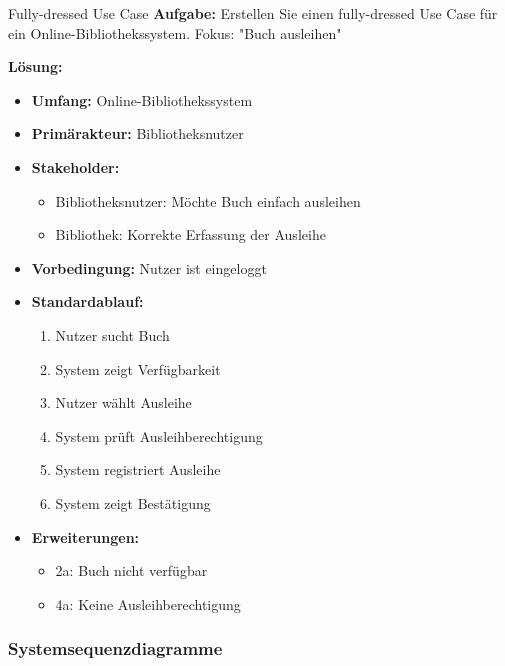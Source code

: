 \begin{example2}{Fully-dressed Use Case}
\textbf{Aufgabe:} Erstellen Sie einen fully-dressed Use Case für ein Online-Bibliothekssystem. Fokus: "Buch ausleihen"

\textbf{Lösung:}
\begin{itemize}
    \item \textbf{Umfang:} Online-Bibliothekssystem
    \item \textbf{Primärakteur:} Bibliotheksnutzer
    \item \textbf{Stakeholder:} 
    \begin{itemize}
        \item Bibliotheksnutzer: Möchte Buch einfach ausleihen
        \item Bibliothek: Korrekte Erfassung der Ausleihe
    \end{itemize}
    \item \textbf{Vorbedingung:} Nutzer ist eingeloggt
    \item \textbf{Standardablauf:}
    \begin{enumerate}
        \item Nutzer sucht Buch
        \item System zeigt Verfügbarkeit
        \item Nutzer wählt Ausleihe
        \item System prüft Ausleihberechtigung
        \item System registriert Ausleihe
        \item System zeigt Bestätigung
    \end{enumerate}
    \item \textbf{Erweiterungen:}
    \begin{itemize}
        \item 2a: Buch nicht verfügbar
        \item 4a: Keine Ausleihberechtigung
    \end{itemize}
\end{itemize}
\end{example2}







\subsubsection{Systemsequenzdiagramme}

